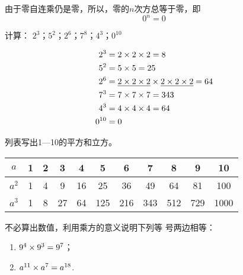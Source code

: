 由于零自连乘仍是零，所以，零的$n$次方总等于零，即
\[0^n=0 \]

\begin{example}
	计算：
	$2^3$；$5^2$；$2^6$；$7^8$；$4^3 $；$0^{10}$
\end{example}

\begin{solution}
	\[\begin{split}
	2^3&=2\times2\times2=8\\
	5^2&=5\times5=25\\
	2^6&=\underline{2\times2\times2}\times\underline{2\times2\times2}=64\\
	7^3&=7\times7\times7=343\\
	4^3&=4\times4\times4=64\\
	0^{10}&=0
	\end{split}\]
\end{solution}

\begin{example}
	列表写出1—10的平方和立方。
\end{example}

\begin{solution}
	\begin{center}
		\begin{tabular}{c|cccccccccc}
			\hline
			$a$ & 1&2&3&4&5&6&7&8&9&10\\
			\hline
			$a^2$&1&4&9&16&25&36&49&64&81&100\\
			$a^3$&1&8&27&64&125&216&343&512&729&1000\\
			\hline
		\end{tabular}
	\end{center}
\end{solution}

\begin{example}
	不必算出数值，利用乘方的意义说明下列等
	号两边相等：
	\begin{enumerate}
		\item $9^4\times9^3=9^7$；
		\item $a^{11}\times a^7=a^{18}$.
	\end{enumerate}
\end{example}


